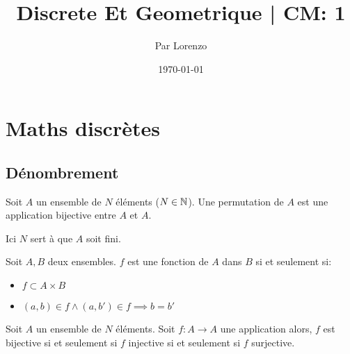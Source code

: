 \documentclass[a4paper, 12pt]{article}
\title{Discrete Et Geometrique | CM: 1}
\author{Par Lorenzo}
\date{\today}
\begin{document}
\maketitle

\section{Maths discrètes}

\subsection{Dénombrement}

\begin{definition}
    Soit $A$ un ensemble de $N$ éléments ($N \in \mathbb{N}$).
    Une permutation de $A$ est une application bijective entre $A$ et $A$.
\end{definition}

\begin{remark}
    Ici $N$ sert à que $A$ soit fini.
\end{remark}

\begin{definition}
    Soit $A, B$ deux ensembles.
    $f$ est une fonction de $A$ dans $B$ si et seulement si:
    \begin{itemize}
        \item $f \subset A \times B$
        \item $(a, b) \in f \land (a, b') \in f \implies b = b'$
    \end{itemize}
\end{definition}

\begin{proposition}
    Soit $A$ un ensemble de $N$ éléments.
    Soit $f: A \to A$ une application alors,
    $f$ est bijective si et seulement si $f$ injective si et seulement si $f$ surjective.
\end{proposition}
\end{document}
